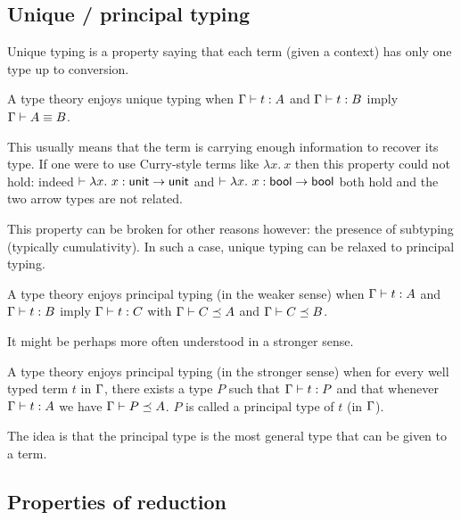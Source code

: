 \subsection{Unique / principal typing}

Unique typing is a property saying that each term (given a context) has only one
type up to conversion.

\begin{definition}
  A type theory enjoys unique typing when
  \(\Gamma \vdash t : A\) and \(\Gamma \vdash t : B\) imply \(\Gamma \vdash A \equiv B\).
\end{definition}

This usually means that the term is carrying enough information to recover
its type. If one were to use Curry-style terms like
\(\lambda x.\ x\) then this property could not hold: indeed
\(\vdash \lambda x.\ x : \mathsf{unit} \to \mathsf{unit}\) and
\(\vdash \lambda x.\ x : \mathsf{bool} \to \mathsf{bool}\) both hold and the two arrow types
are not related.

This property can be broken for other reasons however: \eg the presence of
subtyping (typically cumulativity). In such a case, unique typing can be relaxed
to principal typing.

\begin{definition}
  A type theory enjoys principal typing (in the weaker sense) when
  \(\Gamma \vdash t : A\) and \(\Gamma \vdash t : B\) imply \(\Gamma \vdash t : C\) with
  \(\Gamma \vdash C \preceq A\) and \(\Gamma \vdash C \preceq B\).
\end{definition}

It might be perhaps more often understood in a stronger sense.

\begin{definition}
  A type theory enjoys principal typing (in the stronger sense) when for every
  well typed term \(t\) in \(\Gamma\), there exists a type \(P\) such that
  \(\Gamma \vdash t : P\) and that whenever \(\Gamma \vdash t : A\) we have
  \(\Gamma \vdash P \preceq A\).
  \(P\) is called a principal type of \(t\) (in \(\Gamma\)).
\end{definition}

The idea is that the principal type is the most general type that can be given
to a term.

\subsection{Properties of reduction}

